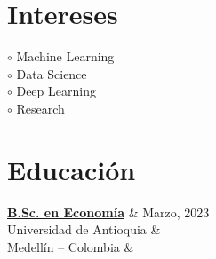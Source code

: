 \documentclass[a3paper,11pt]{article}
\begin{document}
\begin{adjustbox}{valign=t}
\begin{minipage}{0.3\textwidth}
\section*{Intereses}
\raggedright
\textcolor{ColorOne}{$\circ$} Machine Learning\\
\textcolor{ColorOne}{$\circ$} Data Science\\
\textcolor{ColorOne}{$\circ$} Deep Learning\\
\textcolor{ColorOne}{$\circ$} Research

\vfill

\section*{Educación}
\begin{tblr}{}
	{\hypersetup{urlcolor=black}\href{https://github.com/AlRamirezRe/Resume-Documents/blob/master/ACTA-HV1152210514.pdf}{\textbf{B.Sc. en
Economía}}} & \normalfont \textcolor{ColorOne}{Marzo, 2023} \\
	 Universidad de Antioquia &  \\
         Medellín -- Colombia	&  \\
\end{tblr}


\vfill
\end{minipage}
\end{adjustbox}
\end{document}

